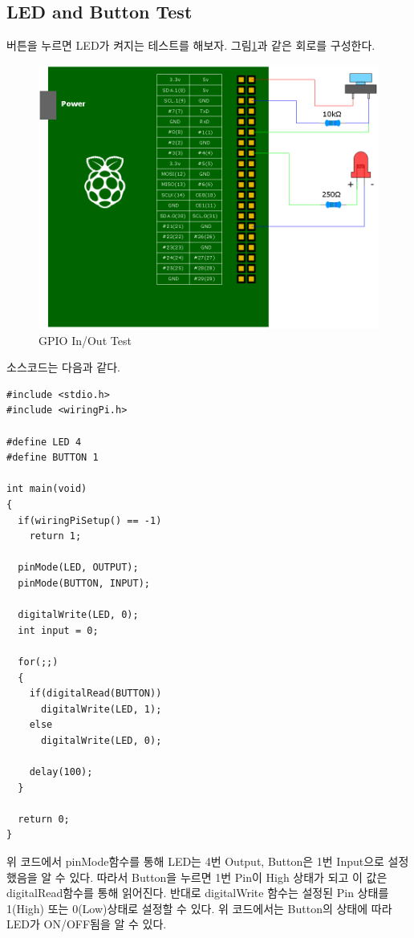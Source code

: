 \documentclass[11pt
  , a4paper
  , article
  , oneside
]{memoir}
\begin{document}
\subsection{LED and Button Test}
버튼을 누르면 LED가 켜지는 테스트를 해보자. 그림\ref{fig:gpio_in_out}과 같은 회로를 구성한다.
\begin{figure}[!htb]
\centering
\includegraphics[width=1\textwidth]{./images/raspberry/ledbuttontest.png}
\caption{GPIO In/Out Test}
\label{fig:gpio_in_out}
\end{figure}
소스코드는 다음과 같다.
\begin{lstlisting}[style=termstylenumber, caption={gpio.c}, label={list:gpioTestCode}]
#include <stdio.h>
#include <wiringPi.h>

#define LED 4
#define BUTTON 1

int main(void)
{
  if(wiringPiSetup() == -1)
    return 1;

  pinMode(LED, OUTPUT);
  pinMode(BUTTON, INPUT);

  digitalWrite(LED, 0);
  int input = 0;

  for(;;)
  {
    if(digitalRead(BUTTON))
      digitalWrite(LED, 1);
    else
      digitalWrite(LED, 0); 

    delay(100);
  }

  return 0;
}
\end{lstlisting}
위 코드에서 pinMode함수를 통해 LED는 4번 Output, Button은 1번 Input으로 설정했음을 알 수 있다. 따라서
Button을 누르면 1번 Pin이 High 상태가 되고 이 값은 digitalRead함수를 통해 읽어진다. 반대로 digitalWrite
함수는 설정된 Pin 상태를 1(High) 또는 0(Low)상태로 설정할 수 있다. 위 코드에서는 Button의 상태에 따라
LED가 ON/OFF됨을 알 수 있다.\\
\end{document}
